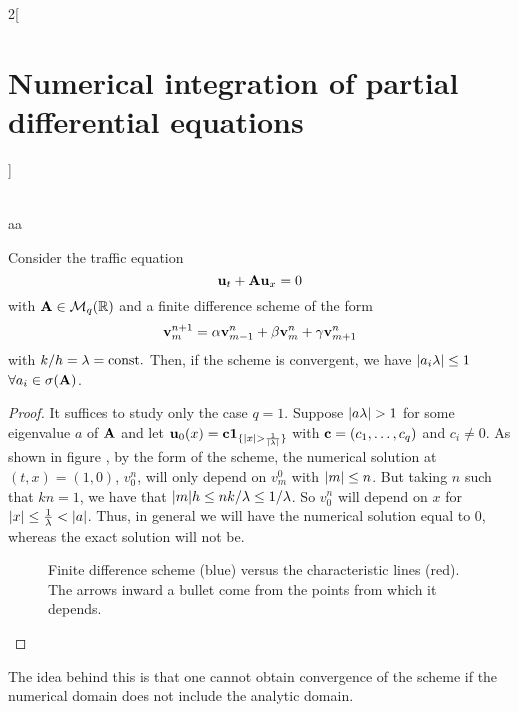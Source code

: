 \documentclass[../../../main_math.tex]{subfiles}
\begin{document}
\begin{multicols}{2}[\section{Numerical integration of partial differential equations}]
\begin{sproof}
\begin{align*}
    \end{align*}
  \end{sproof}aa
  \begin{theorem}
    Consider the traffic equation $$\boldsymbol{\mathrm{u}}_t+\boldsymbol{\mathrm{A}}\boldsymbol{\mathrm{u}}_x=0$$ with $\boldsymbol{\mathrm{A}}\in\mathcal{M}_q(\mathbb{R})$ and a finite difference scheme of the form $$\boldsymbol{\mathrm{v}}_m^{n+1}=\alpha \boldsymbol{\mathrm{v}}_{m-1}^n+\beta \boldsymbol{\mathrm{v}}_m^n+\gamma \boldsymbol{\mathrm{v}}_{m+1}^n$$ with $k/h=\lambda=\text{const.}$ Then, if the scheme is convergent, we have $\abs{a_i\lambda}\leq 1$ $\forall a_i\in\sigma(\boldsymbol{\mathrm{A}})$.
  \end{theorem}
  \begin{proof}
    It suffices to study only the case $q=1$. Suppose $\abs{a\lambda}>1$ for some eigenvalue $a$ of $\boldsymbol{\mathrm{A}}$ and let $\boldsymbol{\mathrm{u}}_0(x)=\boldsymbol{\mathrm{c}}\boldsymbol{\mathrm{1}}_{\{\abs{x}> \frac{1}{\abs{\lambda}}\}}$ with $\boldsymbol{\mathrm{c}}=(c_1,\ldots,c_q)$ and $c_i\ne 0$. As shown in figure , by the form of the scheme, the numerical solution at $(t,x)=(1,0)$, $v_0^n$, will only depend on $v_m^0$ with $\abs{m}\leq n$. But taking $n$ such that $kn=1$, we have that $\abs{m}h\leq nk/\lambda\leq 1/\lambda$. So $v_0^n$ will depend on $x$ for $\abs{x}\leq \frac{1}{\lambda}<\abs{a}$. Thus, in general we will have the numerical solution equal to 0, whereas the exact solution will not be.
    \begin{figure}[H]
      \centering
      
      \caption{Finite difference scheme (blue) versus the characteristic lines (red). The arrows inward a bullet come from the points from which it depends.}
      \label{NIPDE:courant-friedrichs-lewy_fig}
    \end{figure}
  \end{proof}
  \begin{remark}
    The idea behind this is that one cannot obtain convergence of the scheme if the numerical domain does not include the analytic domain.
  \end{remark}

\end{multicols}
\end{document}
